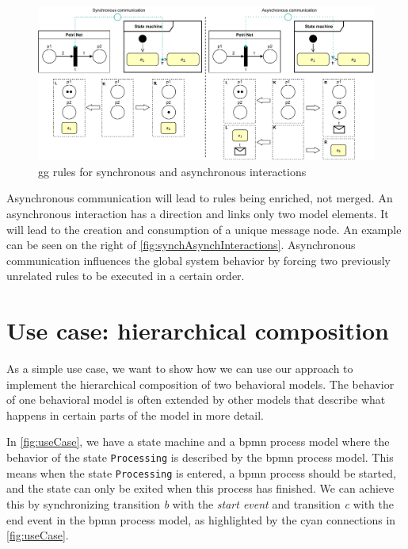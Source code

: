 \documentclass[a4paper]{easychair}
\begin{document}
\begin{figure}[h]
    \centering
    \includegraphics[width=1\textwidth]{images/synch_asynch.pdf}
    \caption{\gls*{gg} rules for synchronous and asynchronous interactions}
    \label{fig:synchAsynchInteractions}
\end{figure}

Asynchronous communication will lead to rules being enriched, not merged.
An asynchronous interaction has a direction and links only two model elements.
It will lead to the creation and consumption of a unique message node. 
An example can be seen on the right of \autoref{fig:synchAsynchInteractions}.
Asynchronous communication influences the global system behavior by forcing two previously unrelated rules to be executed in a certain order.




\section{Use case: hierarchical composition}
As a simple use case, we want to show how we can use our approach to implement the hierarchical composition of two behavioral models.
The behavior of one behavioral model is often extended by other models that describe what happens in certain parts of the model in more detail.

In \autoref{fig:useCase}, we have a state machine and a \gls*{bpmn} process model where the behavior of the state \texttt{Processing} is described by the \gls*{bpmn} process model.
This means when the state \texttt{Processing} is entered, a \gls*{bpmn} process should be started, and the state can only be exited when this process has finished.
We can achieve this by synchronizing transition \textit{b} with the \textit{start event} and transition \textit{c} with the end event in the \gls*{bpmn} process model, as highlighted by the cyan connections in \autoref{fig:useCase}.
\end{document}
